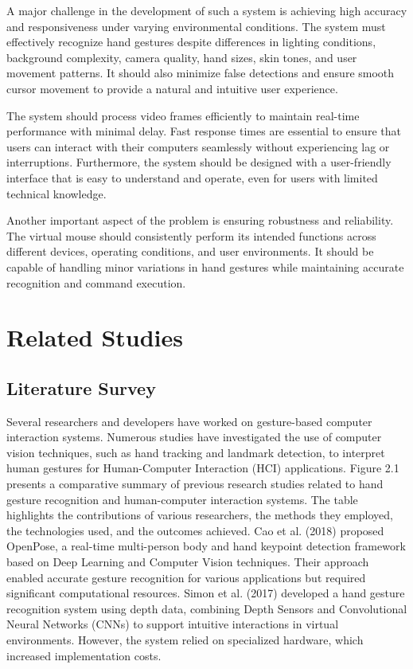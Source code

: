 \documentclass[12pt,a4paper]{report}
\begin{document}
A major challenge in the development of such a system is achieving high accuracy and responsiveness under varying environmental conditions. The system must effectively recognize hand gestures despite differences in lighting conditions, background complexity, camera quality, hand sizes, skin tones, and user movement patterns. It should also minimize false detections and ensure smooth cursor movement to provide a natural and intuitive user experience.

The system should process video frames efficiently to maintain real-time performance with minimal delay. Fast response times are essential to ensure that users can interact with their computers seamlessly without experiencing lag or interruptions. Furthermore, the system should be designed with a user-friendly interface that is easy to understand and operate, even for users with limited technical knowledge.

Another important aspect of the problem is ensuring robustness and reliability. The virtual mouse should consistently perform its intended functions across different devices, operating conditions, and user environments. It should be capable of handling minor variations in hand gestures while maintaining accurate recognition and command execution.

\chapter{Related Studies 
}

\section{Literature Survey}

Several researchers and developers have worked on gesture-based computer interaction systems.
Numerous studies have investigated the use of computer vision techniques, such as hand
tracking and landmark detection, to interpret human gestures for Human-Computer Interaction
(HCI) applications.
Figure 2.1 presents a comparative summary of previous research studies related to hand gesture recognition and human-computer interaction systems. The table highlights the contributions of various researchers, the methods they employed, the technologies used, and the outcomes achieved. Cao et al. (2018) proposed OpenPose, a real-time multi-person body and hand keypoint detection framework based on Deep Learning and Computer Vision techniques. Their approach enabled accurate gesture recognition for various applications but required significant computational resources. Simon et al. (2017) developed a hand gesture recognition system using depth data, combining Depth Sensors and Convolutional Neural Networks (CNNs) to support intuitive interactions in virtual environments. However, the system relied on specialized hardware, which increased implementation costs.
\end{document}
